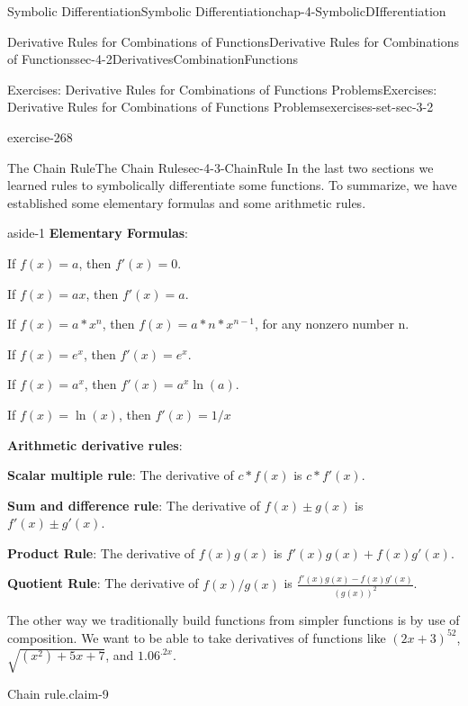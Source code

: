 \documentclass[oneside,10pt,]{book}
\newcommand{\terminology}[1]{\textbf{#1}}
\numberwithin{equation}{section}
\begin{document}
\begin{chapterptx}{Symbolic Differentiation}{}{Symbolic Differentiation}{}{}{chap-4-SymbolicDIfferentiation}
\begin{sectionptx}{Derivative Rules for Combinations of Functions}{}{Derivative Rules for Combinations of Functions}{}{}{sec-4-2DerivativesCombinationFunctions}
\begin{exercises-subsection}{Exercises: Derivative Rules for Combinations of Functions Problems}{}{Exercises: Derivative Rules for Combinations of Functions Problems}{}{}{exercises-set-sec-3-2}
\begin{divisionexercise}{26}{}{}{exercise-268}
\end{divisionexercise}%
\end{exercises-subsection}
\end{sectionptx}
%
%
\typeout{************************************************}
\typeout{************************************************}
%
\begin{sectionptx}{The Chain Rule}{}{The Chain Rule}{}{}{sec-4-3-ChainRule}
\hypertarget{p-1614}{}%
In the last two sections we learned rules to symbolically differentiate some functions.  To summarize, we have established some elementary formulas and some arithmetic rules.%
\begin{aside}{}{aside-1}%
\hypertarget{p-1615}{}%
\terminology{Elementary Formulas}:%
\par
\hypertarget{p-1616}{}%
If \(f(x)=a\), then \(f'(x)=0\).%
\par
\hypertarget{p-1617}{}%
If \(f(x)=ax\), then \(f'(x)=a\).%
\par
\hypertarget{p-1618}{}%
If \(f(x)=a*x^n\), then \(f(x)=a*n*x^{n-1}\), for any nonzero number n.%
\par
\hypertarget{p-1619}{}%
If \(f(x)=e^x\), then \(f'(x)=e^x\).%
\par
\hypertarget{p-1620}{}%
If \(f(x)=a^x\), then \(f'(x)=a^x \ln(a)\).%
\par
\hypertarget{p-1621}{}%
If \(f(x)=\ln(x)\), then \(f'(x)=1/x\)%
\par
\hypertarget{p-1622}{}%
\terminology{Arithmetic derivative rules}:%
\par
\hypertarget{p-1623}{}%
\terminology{Scalar multiple rule}:	The derivative of \(c*f(x)\) is \(c*f'(x)\).%
\par
\hypertarget{p-1624}{}%
\terminology{Sum and difference rule}: The derivative of \(f(x)\pm g(x)\) is \(f'(x)\pm g'(x)\).%
\par
\hypertarget{p-1625}{}%
\terminology{Product Rule}:	 The derivative of \(f(x)g(x)\) is \(f' (x) g(x)+f(x)g'(x)\).%
\par
\hypertarget{p-1626}{}%
\terminology{Quotient Rule}:  The derivative of \(f(x)/g(x)\) is \(\frac{f'(x)g(x)-f(x)g'(x)}{(g(x))^2} \).%
\end{aside}
\hypertarget{p-1627}{}%
The other way we traditionally build functions from simpler functions is by use of composition.  We want to be able to take derivatives of functions like \((2x+3)^{52}\), \(\sqrt{(x^2 )+5x+7}\), and \(1.06^{.2x}\).%
\begin{claim}{Chain rule.}{}{claim-9}%

\end{claim}
\end{sectionptx}
\end{chapterptx}
\end{document}
